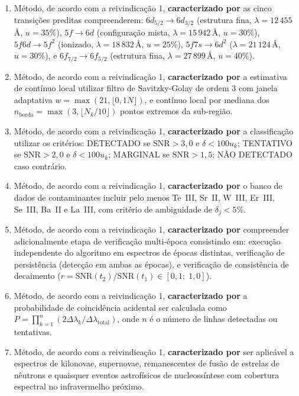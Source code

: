 \documentclass[12pt,a4paper]{article}
\begin{document}
\begin{enumerate}

\item Método, de acordo com a reivindicação 1, \textbf{caracterizado
por} as cinco transições preditas compreenderem:
$6d_{5/2} \to 6d_{3/2}$ (estrutura fina, $\lambda = 12\,455$\,\AA,
$u = 35\%$),
$5f \to 6d$ (configuração mista, $\lambda = 15\,942$\,\AA,
$u = 30\%$),
$5f6d \to 5f^2$ (ionizado, $\lambda = 18\,832$\,\AA, $u = 25\%$),
$5f7s \to 6d^2$ ($\lambda = 21\,124$\,\AA, $u = 30\%$), e
$6f_{7/2} \to 6f_{5/2}$ (estrutura fina, $\lambda = 27\,899$\,\AA,
$u = 40\%$).

\item Método, de acordo com a reivindicação 1, \textbf{caracterizado
por} a estimativa de contínuo local utilizar filtro de
Savitzky-Golay de ordem 3 com janela adaptativa
$w = \max(21, \lfloor 0{,}1 N \rfloor)$, e contínuo local por
mediana dos $n_{\text{borda}} = \max(3, \lfloor N_k/10 \rfloor)$
pontos extremos da sub-região.

\item Método, de acordo com a reivindicação 1, \textbf{caracterizado
por} a classificação utilizar os critérios: DETECTADO se
$\text{SNR} > 3{,}0$ e $\delta < 100 u_k$; TENTATIVO se
$\text{SNR} > 2{,}0$ e $\delta < 100 u_k$; MARGINAL se
$\text{SNR} > 1{,}5$; NÃO DETECTADO caso contrário.

\item Método, de acordo com a reivindicação 1, \textbf{caracterizado
por} o banco de dados de contaminantes incluir pelo menos Te~III,
Sr~II, W~III, Er~III, Se~III, Ba~II e La~III, com critério de
ambiguidade de $\delta_j < 5\%$.

\item Método, de acordo com a reivindicação 1, \textbf{caracterizado
por} compreender adicionalmente etapa de verificação multi-época
consistindo em: execução independente do algoritmo em espectros de
épocas distintas, verificação de persistência (detecção em ambas as
épocas), e verificação de consistência de decaimento
($r = \text{SNR}(t_2)/\text{SNR}(t_1) \in [0{,}1;\; 1{,}0]$).

\item Método, de acordo com a reivindicação 1, \textbf{caracterizado
por} a probabilidade de coincidência acidental ser calculada como
$P = \prod_{k=1}^{n} (2\Delta\lambda_k / \Delta\lambda_{\text{total}})$,
onde $n$ é o número de linhas detectadas ou tentativas.

\item Método, de acordo com a reivindicação 1, \textbf{caracterizado
por} ser aplicável a espectros de kilonovae, supernovae,
remanescentes de fusão de estrelas de nêutrons e quaisquer
eventos astrofísicos de nucleossíntese com cobertura espectral
no infravermelho próximo.


\end{enumerate}
\end{document}
